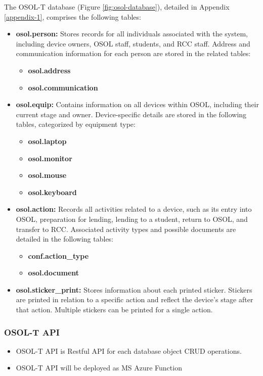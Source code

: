 \documentclass[a4paper,11pt]{article}
\begin{document}
The OSOL-T database (Figure \ref{fig:osol-database}), detailed in Appendix \ref{appendix-1}, comprises the following tables:
\begin{itemize}
	\item \textbf{osol.person:} Stores records for all individuals associated with the system, including device owners, OSOL staff, students, and RCC staff.  Address and communication information for each person are stored in the related tables:
	\begin{itemize}
		\item \textbf{osol.address}
		\item \textbf{osol.communication}
	\end{itemize}
	\item \textbf{osol.equip:} Contains information on all devices within OSOL, including their current stage and owner.  Device-specific details are stored in the following tables, categorized by equipment type:
	\begin{itemize}
		\item \textbf{osol.laptop}
		\item \textbf{osol.monitor}
		\item \textbf{osol.mouse}
		\item \textbf{osol.keyboard}
	\end{itemize}
	\item \textbf{osol.action:} Records all activities related to a device, such as its entry into OSOL, preparation for lending, lending to a student, return to OSOL, and transfer to RCC.  Associated activity types and possible documents are detailed in the following tables:
	\begin{itemize}
		\item \textbf{conf.action\_type}
		\item \textbf{osol.document}
	\end{itemize}
	\item \textbf{osol.sticker\_print:} Stores information about each printed sticker.  Stickers are printed in relation to a specific action and reflect the device's stage after that action.  Multiple stickers can be printed for a single action.
\end{itemize}


\subsubsection{OSOL-T API}
\begin{itemize}
	\item OSOL-T API is Restful API for each database object CRUD operations.
	\item OSOL-T API will be deployed as MS Azure Function 
\end{itemize}
\end{document}
